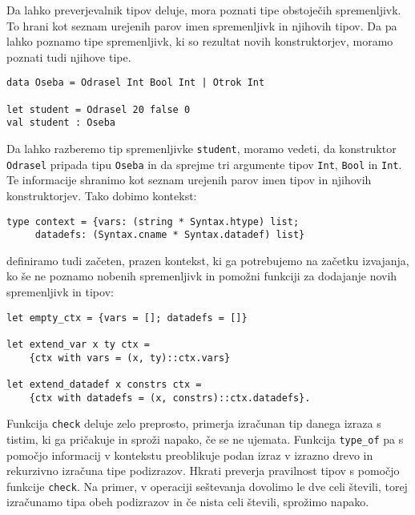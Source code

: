 \documentclass[12pt,a4paper,openany]{book}
\begin{document}
 Da lahko preverjevalnik tipov deluje, mora poznati tipe obstoječih spremenljivk. To hrani kot seznam urejenih parov imen spremenljivk in njihovih tipov. Da pa lahko poznamo tipe spremenljivk, 
 ki so rezultat novih konstruktorjev, moramo poznati tudi njihove tipe.
 \begin{lstlisting}
data Oseba = Odrasel Int Bool Int | Otrok Int

let student = Odrasel 20 false 0
val student : Oseba
\end{lstlisting}
Da lahko razberemo tip spremenljivke \lstinline{student}, moramo vedeti, da konstruktor \lstinline{Odrasel} pripada tipu \lstinline{Oseba} in da sprejme tri argumente tipov \lstinline{Int}, \lstinline{Bool} in \lstinline{Int}. Te informacije shranimo kot seznam urejenih parov imen 
tipov in njihovih konstruktorjev. Tako dobimo kontekst:
\begin{lstlisting}
type context = {vars: (string * Syntax.htype) list; 
     datadefs: (Syntax.cname * Syntax.datadef) list}
\end{lstlisting}
definiramo tudi začeten, prazen kontekst, ki ga potrebujemo na začetku izvajanja, ko še ne poznamo nobenih spremenljivk in pomožni funkciji za dodajanje novih spremenljivk in tipov:
\begin{lstlisting}
let empty_ctx = {vars = []; datadefs = []}

let extend_var x ty ctx = 
    {ctx with vars = (x, ty)::ctx.vars}

let extend_datadef x constrs ctx = 
    {ctx with datadefs = (x, constrs)::ctx.datadefs}.
\end{lstlisting}

Funkcija \lstinline{check} deluje zelo preprosto, primerja izračunan tip danega izraza s tistim, ki ga pričakuje in sproži napako, če se ne ujemata. Funkcija \lstinline{type_of} pa s pomočjo informacij 
v kontekstu preoblikuje podan izraz v izrazno drevo in rekurzivno izračuna tipe podizrazov. Hkrati preverja pravilnost tipov s pomočjo funkcije \lstinline{check}. Na primer, v operaciji seštevanja 
dovolimo le dve celi števili, torej izračunamo tipa obeh podizrazov in če nista celi števili, sprožimo napako.
\end{document}
